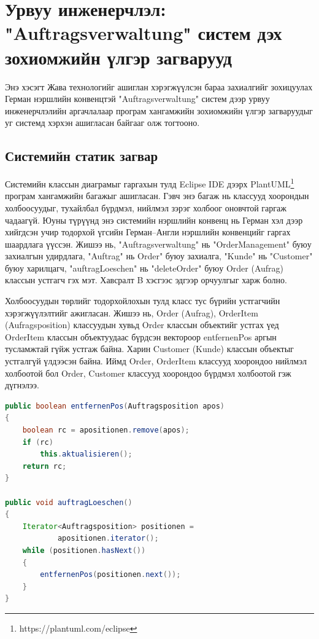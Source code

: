 \section{Урвуу инженерчлэл: "Auftragsverwaltung" систем дэх зохиомжийн үлгэр загварууд}
Энэ хэсэгт Жава технологийг ашиглан хэрэгжүүлсэн бараа захиалгийг зохицуулах Герман нэршлийн конвенцтэй "Auftragsverwaltung" систем дээр урвуу инженерчлэлийн аргачлалаар програм хангамжийн зохиомжийн үлгэр загваруудыг уг системд хэрхэн ашигласан байгааг олж тогтооно.

\subsection{Системийн статик загвар}
Системийн классын диаграмыг гаргахын тулд Eclipse IDE дээрх PlantUML\footnote{https://plantuml.com/eclipse} програм хангамжийн багажыг ашигласан. Гэвч энэ багаж нь классууд хоорондын холбоосуудыг, тухайлбал бүрдмэл, нийлмэл зэрэг холбоог оновчтой гаргаж чадаагүй. Юуны түрүүнд энэ системийн нэршлийн конвенц нь Герман хэл дээр хийгдсэн учир тодорхой үгсийн Герман–Англи нэршлийн конвенцийг гаргах шаардлага үүссэн. Жишээ нь, "Auftragsverwaltung" нь "OrderManagement" буюу захиалгын удирдлага, "Auftrag" нь Order" буюу захиалга, "Kunde" нь "Customer" буюу харилцагч, "auftragLoeschen" нь "deleteOrder" буюу Order (Aufrag) классын устгагч гэх мэт. Хавсралт B хэсгээс эдгээр орчуулгыг харж болно.

Холбоосуудын төрлийг тодорхойлохын тулд класс тус бүрийн устгагчийн хэрэгжүүлэлтийг ажигласан. Жишээ нь, Order (Aufrag), OrderItem (Aufragsposition) классуудын хувьд Order классын объектийг устгах үед OrderItem классын объектуудаас бүрдсэн вектороор entfernenPos аргын тусламжтай гүйж устгаж байна. Харин Customer (Kunde) классын объектыг устгалгүй үлдээсэн байна. Иймд Order, OrderItem классууд хоорондоо нийлмэл холбоотой бол Order, Customer классууд хоорондоо бүрдмэл холбоотой гэж дүгнэлээ.
\begin{lstlisting}[language=Java, caption=Order классын устгагч auftragLoeschen, frame=single]
public boolean entfernenPos(Auftragsposition apos)
{
    boolean rc = apositionen.remove(apos);
    if (rc)
        this.aktualisieren();
    return rc;
}

public void auftragLoeschen()
{
    Iterator<Auftragsposition> positionen =
            apositionen.iterator();
    while (positionen.hasNext())
    {
        entfernenPos(positionen.next());
    }
}
\end{lstlisting}

